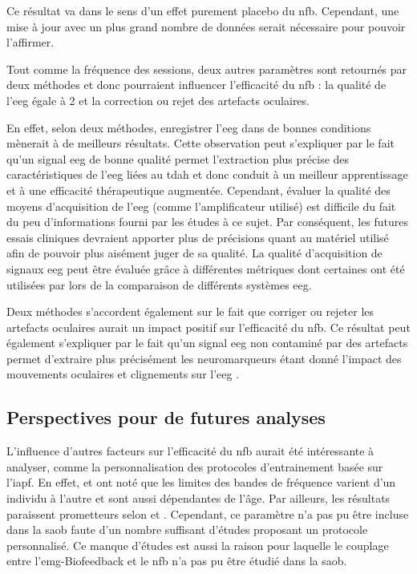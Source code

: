 Ce résultat va dans le sens d'un effet purement placebo du \gls{nfb}. Cependant, une mise à jour avec un plus grand nombre de données serait nécessaire pour pouvoir l'affirmer.

Tout comme la fréquence des sessions, deux autres paramètres sont retournés par deux méthodes et donc pourraient influencer 
l'efficacité du \gls{nfb} : la qualité de l'\gls{eeg} égale à 2 et la correction ou rejet des artefacts oculaires.

En effet, selon deux méthodes, enregistrer l'\gls{eeg} dans de bonnes conditions mènerait à de meilleurs résultats. Cette observation peut s'expliquer par le fait qu'un signal
\gls{eeg} de bonne qualité permet l'extraction plus précise des caractéristiques de l'\gls{eeg} liées au \gls{tdah} et donc conduit à un meilleur apprentissage et 
à une efficacité thérapeutique augmentée. Cependant, évaluer la qualité des moyens d'acquisition de l'\gls{eeg} (comme l'amplificateur utilisé) 
est difficile du fait du peu d'informations fourni par les études à ce sujet. Par conséquent, les futures essais cliniques devraient apporter plus 
de précisions quant au matériel utilisé afin de pouvoir plus aisément juger de sa qualité. La qualité d'acquisition de signaux \gls{eeg} peut être évaluée grâce à différentes
métriques dont certaines ont été utilisées par \citep{Bussalb2018benchmark} lors de la comparaison de différents systèmes \gls{eeg}. 

Deux méthodes s'accordent également sur le fait que corriger ou rejeter les artefacts oculaires aurait un impact positif sur l'efficacité du \gls{nfb}. Ce résultat peut également
s'expliquer par le fait qu'un signal \gls{eeg} non contaminé par des artefacts permet d'extraire plus précisément les neuromarqueurs \citep{Barthelemy2017, Barthelemy2019} étant donné l'impact
des mouvements oculaires et clignements sur l'\gls{eeg} \citep{Iwasaki2005}. 

\subsection{Perspectives pour de futures analyses}

L'influence d'autres facteurs sur l'efficacité du \gls{nfb} aurait été intéressante à analyser, comme la personnalisation des 
protocoles d'entrainement basée sur l'\gls{iapf}. En effet, \citet{Vernon2004} et \citet{Klimesch1999} ont noté que les limites des bandes 
de fréquence varient d'un individu à l'autre et sont aussi dépendantes de l'âge. Par ailleurs, les résultats paraissent prometteurs selon 
\citet{Bazanova2018, Escolano2014} et \citet{Alkoby2017}. Cependant, ce paramètre n'a pas pu être incluse dans la \gls{saob} faute d'un 
nombre suffisant d'études proposant un protocole personnalisé. Ce manque d'études est aussi la raison pour laquelle le couplage entre l'\gls{emg}-Biofeedback 
et le \gls{nfb} n'a pas pu être étudié dans la \gls{saob}. 


